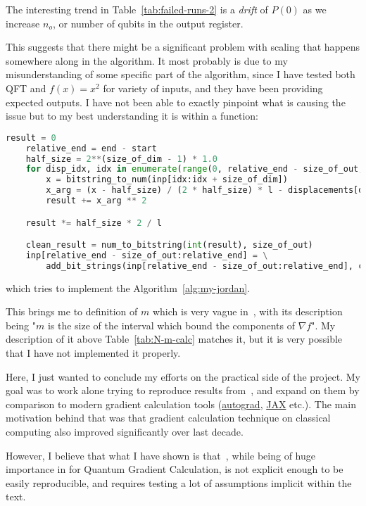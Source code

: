 \documentclass{article}
\begin{document}
The interesting trend in Table~\ref{tab:failed-runs-2} is a \textit{drift} of $P(0)$ as we increase $n_o$,
or number of qubits in the output register.

This suggests that there might be a significant problem with scaling that happens somewhere along in the algorithm.
It most probably is due to my misunderstanding of some specific part of the algorithm,
since I have tested both QFT and $f(x) = x^2$ for variety of inputs, and they have been providing expected outputs.
I have not been able to exactly pinpoint what is causing the issue but to my best understanding it is within a function:
\begin{lstlisting}[language=Python]
    result = 0
    relative_end = end - start
    half_size = 2**(size_of_dim - 1) * 1.0
    for disp_idx, idx in enumerate(range(0, relative_end - size_of_out, size_of_dim)):
        x = bitstring_to_num(inp[idx:idx + size_of_dim])
        x_arg = (x - half_size) / (2 * half_size) * l - displacements[disp_idx]
        result += x_arg ** 2

    result *= half_size * 2 / l

    clean_result = num_to_bitstring(int(result), size_of_out)
    inp[relative_end - size_of_out:relative_end] = \
        add_bit_strings(inp[relative_end - size_of_out:relative_end], clean_result)
\end{lstlisting}
which tries to implement the Algorithm~\ref{alg:my-jordan}.

This brings me to definition of $m$ which is very vague in~\cite{Jordan_2005}, with its description being
"$m$ is the size of the interval which bound the components of $\nabla f$".
My description of it above Table~\ref{tab:N-m-calc} matches it, but it is very possible that I have not implemented it properly.

Here, I just wanted to conclude my efforts on the practical side of the project. My goal was to work alone trying to reproduce
results from~\cite{Jordan_2005}, and expand on them by comparison to modern gradient calculation tools
(\href{https://github.com/HIPS/autograd}{autograd}, \href{https://github.com/google/jax}{JAX} etc.).
The main motivation behind that was that gradient calculation technique on classical computing also improved significantly over last decade.

However, I believe that what I have shown is that~\cite{Jordan_2005}, while being of huge importance in for Quantum Gradient Calculation,
is not explicit enough to be easily reproducible, and requires testing a lot of assumptions implicit within the text.
\end{document}
